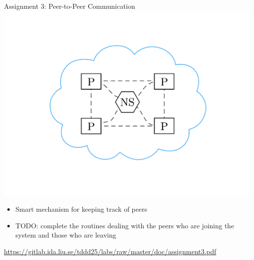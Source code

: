 \documentclass[compress,xcolor=table]{beamer}
\begin{document}
\begin{frame}{Assignment 3: Peer-to-Peer Communication}
  \centering
  \includegraphics[scale=0.10,page=1]{include/assets/chat}
  \begin{itemize}
    \item Smart mechanism for keeping track of peers
    \item \alert{TODO}: complete the routines dealing with the peers who are joining the system and those who are leaving
  \end{itemize}
  \begin{center}
    \scriptsize \url{https://gitlab.ida.liu.se/tddd25/labs/raw/master/doc/assignment3.pdf}
  \end{center}
\end{frame}
\end{document}
